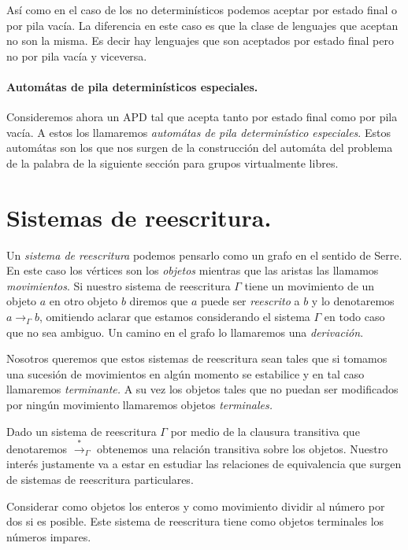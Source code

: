 \documentclass[tesis.tex]{subfiles}
\begin{document}
Así como en el caso de los no determinísticos podemos aceptar por estado final o por pila vacía. La diferencia en este caso es que la clase de lenguajes que aceptan no son la misma. Es decir hay lenguajes que son aceptados por estado final pero no por pila vacía y viceversa.

\paragraph{Automátas de pila determinísticos especiales.} Consideremos ahora un APD tal que acepta tanto por estado final como por pila vacía. A estos los llamaremos \textit{automátas de pila determinístico especiales}.  
Estos automátas son los que nos surgen de la construcción del automáta del problema de la palabra de la siguiente sección para grupos virtualmente libres.

\section{Sistemas de reescritura.}

Un \emph{sistema de reescritura} podemos pensarlo como un grafo en el sentido de Serre. En este caso los vértices son los \emph{objetos} mientras que las aristas las llamamos \emph{movimientos}.  Si nuestro sistema de reescritura $\Gamma$ tiene un movimiento de un objeto $a$ en otro objeto $b$ diremos que $a$ puede ser \emph{reescrito} a $b$ y lo denotaremos $a \to_{\Gamma} b$, omitiendo aclarar que estamos considerando el sistema $\Gamma$ en todo caso que no sea ambiguo. Un camino en el grafo lo llamaremos una \emph{derivación}.  

Nosotros queremos que estos sistemas de reescritura sean tales que si tomamos una sucesión de movimientos en algún momento se estabilice y en tal caso llamaremos \emph{terminante.} A su vez los objetos tales que no puedan ser modificados por ningún movimiento llamaremos objetos \emph{terminales.} 

Dado un sistema de reescritura $\Gamma$ por medio de la clausura transitiva que denotaremos $\overset{*}{\rightarrow}_{\Gamma}$ obtenemos una relación transitiva sobre los objetos. Nuestro interés justamente va a estar en estudiar las relaciones de equivalencia que surgen de sistemas de reescritura particulares. 

\begin{ej}
	Considerar como objetos los enteros y como movimiento dividir al número por dos si es posible. Este sistema de reescritura tiene como objetos terminales los números impares.
\end{ej}
\end{document}
